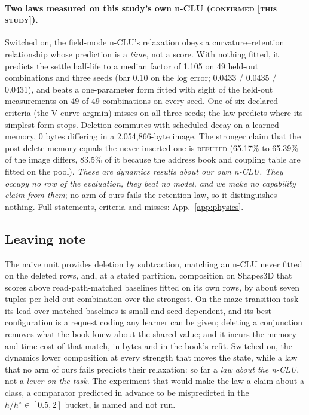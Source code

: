 \documentclass{article} %
\begin{document}
\paragraph{Two laws measured on this study's own n-CLU (\textsc{confirmed [this study]}).}
Switched on, the field-mode n-CLU's relaxation obeys a curvature--retention relationship whose
prediction is a \emph{time}, not a score. With nothing fitted, it predicts the settle half-life to
a median factor of 1.105 on 49 held-out combinations and three seeds (bar 0.10 on the log error; 0.0433
/ 0.0435 / 0.0431), and beats a one-parameter form fitted with sight of the held-out
measurements on 49 of 49 combinations on every seed. One of six declared criteria (the V-curve
argmin) misses on all three seeds; the law predicts where its simplest form stops.
Deletion commutes with scheduled decay on a learned memory, 0 bytes differing in a
2,054,866-byte image. The stronger claim that the post-delete memory equals the never-inserted one is \textsc{refuted} (65.17\% to 65.39\% of the image differs, 83.5\% of it because the
address book and coupling table are fitted on the pool). %
\emph{These are dynamics results about our own n-CLU. They occupy no row of the evaluation, they
beat no model, and we make no capability claim from them}; no arm of ours fails the retention law, so it distinguishes nothing. Full statements, criteria and misses: App.~\ref{app:physics}.

\subsection{Leaving note}
\label{sec:leaving}

The naive unit provides deletion by subtraction, matching an n-CLU never fitted on the deleted rows, and, at a stated partition, composition on
Shapes3D that scores above read-path-matched baselines fitted on its own rows, by about seven tuples per
held-out combination over the strongest. On the maze transition task its lead over matched
baselines is small and seed-dependent, and its best configuration is a request coding any learner can be
given; deleting a conjunction removes what the book knew about the shared value; and it incurs the
memory and time cost of that match, in bytes and in the book's refit. Switched on, the dynamics lower composition at
every strength that moves the state, while a law that no arm of ours fails predicts their relaxation:
so far a \emph{law about the n-CLU}, not a \emph{lever on the task}. The experiment that would make
the law a claim about a class, a comparator predicted in advance to be mispredicted in the
$h/h^\star\in[0.5,2]$ bucket, is named and not run. %
\end{document}
